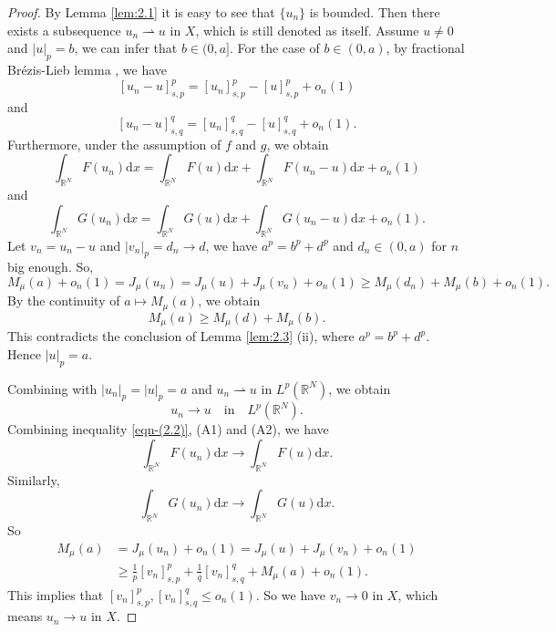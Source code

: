 \documentclass[reqno]{amsart}
\begin{document}
\begin{proof}
By Lemma \ref{lem:2.1} it is easy to see that $\{u_n\}$ is bounded. 
Then there exists a subsequence $u_n\rightharpoonup u$ in $X$, which is still 
denoted as itself.
Assume $u\neq 0$ and $|u|_p=b$,
we can infer that $b\in(0,a]$. For the case of $b\in(0,a)$,
by fractional Br\'{e}zis-Lieb lemma \cite{ref1}, we have
$$
[u_n-u]_{s,p}^{p}=[u_n]_{s,p}^{p}-[u]_{s,p}^{p}+o_n(1)
$$
and
$$
[u_n-u]_{s,q}^{q}=[u_n]_{s,q}^{q}-[u]_{s,q}^{q}+o_n(1).
$$
Furthermore, under the assumption of $f$ and $g$, we obtain
$$
\int_{\mathbb{R}^N}F(u_n)\mathrm{d}x
=\int_{\mathbb{R}^N}F(u)\mathrm{d}x+\int_{\mathbb{R}^N}F(u_n-u)\mathrm{d}x+o_n(1)
$$
and
$$
\int_{\mathbb{R}^N}G(u_n)\mathrm{d}x=\int_{\mathbb{R}^N}G(u)\mathrm{d}x
+\int_{\mathbb{R}^N}G(u_n-u)\mathrm{d}x+o_n(1).
$$
Let $v_n=u_n-u$ and $|v_n|_p=d_n\to d$, we have $a^{p}=b^{p}+d^{p}$ and 
$d_n\in(0,a)$ for $n$ big enough. So,
$$
M_\mu(a)+o_n(1)=J_\mu(u_n)=J_\mu(u)+J_\mu(v_n)+o_n(1)\ge M_\mu(d_n)+M_\mu(b)+o_n(1).
$$
By the continuity of $a\mapsto M_\mu (a)$, we obtain
$$
M_\mu(a)\ge M_\mu(d)+M_\mu(b).
$$
This contradicts the conclusion of Lemma \ref{lem:2.3} (ii),
 where $a^{p}=b^{p}+d^{p}$.
Hence $|u|_p=a$.

Combining with $|u_n|_p=|u|_p=a$ and $u_n\rightharpoonup u$ in $L^{p}(\mathbb{R}^N)$, 
we obtain
\begin{equation}\label{eqn-(2.8)}
u_n\to u \quad \text{in} \quad L^{p}(\mathbb{R}^N).
\end{equation}
Combining inequality \eqref{eqn-(2.2)}, (A1) and (A2), we have
\begin{equation}\label{eqn-(2.9)}
\int_{\mathbb{R}^N}F(u_n)\mathrm{d}x\to\int_{\mathbb{R}^N}F(u)\mathrm{d}x.
\end{equation}
Similarly,
\begin{equation}\label{eqn-(2.10)}
\int_{\mathbb{R}^N}G(u_n)\mathrm{d}x\to\int_{\mathbb{R}^N}G(u)\mathrm{d}x.
\end{equation}
So
\begin{align*}
M_\mu(a)
&=J_\mu(u_n)+o_n(1)=J_\mu(u)+J_\mu(v_n)+o_n(1)\\
&\ge\frac{1}{p}[v_n]_{s,p}^{p}+\frac{1}{q}[v_n]_{s,q}^{q}+M_\mu(a)+o_n(1).
\end{align*}
This implies that $[v_n]_{s,p}^{p},[v_n]_{s,q}^{q}\le o_n(1)$.
So we have $v_n\to 0$ in $X$, which means $u_n\to u$ in $X$.


\end{proof}
\end{document}

